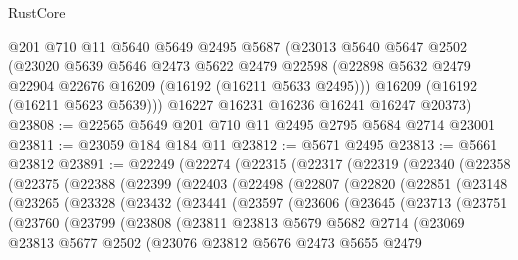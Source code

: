 \begin{lexlean}{RustCore}
\begin{coremodule}
    @201
    @710
    @11
    @5640
    @5649
    @2495
    @5687
    (@23013
      @5640
      @5647
      @2502
      (@23020
        @5639
        @5646
        @2473
        @5622
        @2479
        @22598
        (@22898 @5632 @2479 @22904 @22676 @16209 (@16192 (@16211 @5633 @2495)))
        @16209
        (@16192 (@16211 @5623 @5639)))
      @16227
      @16231
      @16236
      @16241
      @16247
      @20373)
@23808 := @22565 @5649 @201 @710 @11 @2495 @2795 @5684 @2714 @23001
@23811 := @23059 @184 @184 @11
@23812 := @5671 @2495
@23813 := @5661 @23812
@23891 := @22249
    (@22274
      (@22315
        (@22317
          (@22319
            (@22340
              (@22358
                (@22375
                  (@22388
                    (@22399
                      (@22403
                        (@22498
                          (@22807
                            (@22820
                              (@22851
                                (@23148
                                  (@23265
                                    (@23328
                                      (@23432
                                        (@23441
                                          (@23597
                                            (@23606
                                              (@23645
                                                (@23713
                                                  (@23751
                                                    (@23760
                                                      (@23799
                                                        (@23808
                                                          (@23811
                                                            @23813
                                                            @5679
                                                            @5682
                                                            @2714
                                                            (@23069
                                                              @23813
                                                              @5677
                                                              @2502
                                                              (@23076
                                                                @23812
                                                                @5676
                                                                @2473
                                                                @5655
                                                                @2479

\end{coremodule}
\end{lexlean}

